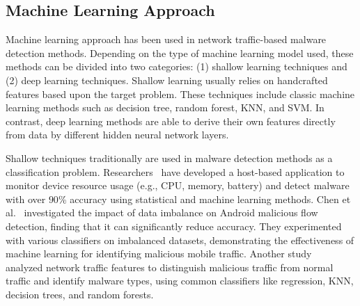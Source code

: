 \subsection{Machine Learning Approach}

Machine learning approach has been used in network traffic-based malware detection methods. Depending on the type of machine learning model used, these methods can be divided into two categories: (1) shallow learning techniques and (2) deep learning techniques. Shallow learning usually relies on handcrafted features based upon the target problem. These techniques include classic machine learning methods such as decision tree, random forest, KNN, and SVM. In contrast, deep learning methods are able to derive their own features directly from data by different hidden neural network layers.

 Shallow techniques traditionally are used in malware detection methods as a classification problem. Researchers~\cite{RIBEIRO2020} have developed a host-based application to monitor device resource usage (e.g., CPU, memory, battery) and detect malware with over $90$\% accuracy using statistical and machine learning methods. Chen et al.~\cite{CHEN2018346} investigated the impact of data imbalance on Android malicious flow detection, finding that it can significantly reduce accuracy. They experimented with various classifiers on imbalanced datasets, demonstrating the effectiveness of machine learning for identifying malicious mobile traffic. Another study~\cite{lashkari:pst-2017} analyzed network traffic features to distinguish malicious traffic from normal traffic and identify malware types, using common classifiers like regression, KNN, decision trees, and random forests.



